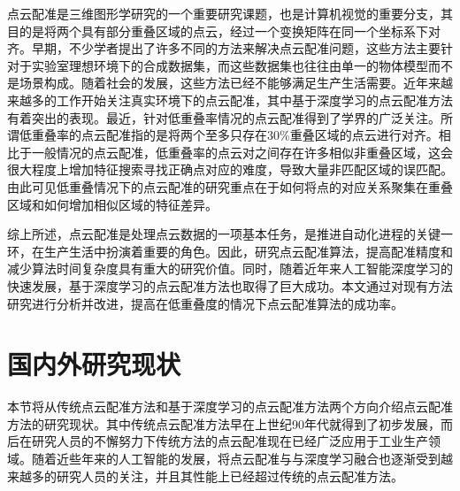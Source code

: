 点云配准是三维图形学研究的一个重要研究课题，也是计算机视觉的重要分支，其目的是将两个具有部分重叠区域的点云，经过一个变换矩阵在同一个坐标系下对齐。早期，不少学者提出了许多不同的方法来解决点云配准问题，这些方法主要针对于实验室理想环境下的合成数据集，而这些数据集也往往由单一的物体模型而不是场景构成。随着社会的发展，这些方法已经不能够满足生产生活需要。近年来越来越多的工作开始关注真实环境下的点云配准，其中基于深度学习的点云配准方法有着突出的表现。最近，针对低重叠率情况的点云配准得到了学界的广泛关注。所谓低重叠率的点云配准指的是将两个至多只存在30\%重叠区域的点云进行对齐。相比于一般情况的点云配准，低重叠率的点云对之间存在许多相似非重叠区域，这会很大程度上增加特征搜索寻找正确点对应的难度，导致大量非匹配区域的误匹配。由此可见低重叠情况下的点云配准的研究重点在于如何将点的对应关系聚集在重叠区域和如何增加相似区域的特征差异。

综上所述，点云配准是处理点云数据的一项基本任务，是推进自动化进程的关键一环，在生产生活中扮演着重要的角色。因此，研究点云配准算法，提高配准精度和减少算法时间复杂度具有重大的研究价值。同时，随着近年来人工智能深度学习的快速发展，基于深度学习的点云配准方法也取得了巨大成功。本文通过对现有方法研究进行分析并改进，提高在低重叠度的情况下点云配准算法的成功率。

\section{国内外研究现状}
本节将从传统点云配准方法和基于深度学习的点云配准方法两个方向介绍点云配准方法的研究现状。其中传统点云配准方法早在上世纪90年代就得到了初步发展，而后在研究人员的不懈努力下传统方法的点云配准现在已经广泛应用于工业生产领域。随着近些年来的人工智能的发展，将点云配准与与深度学习融合也逐渐受到越来越多的研究人员的关注，并且其性能上已经超过传统的点云配准方法。

